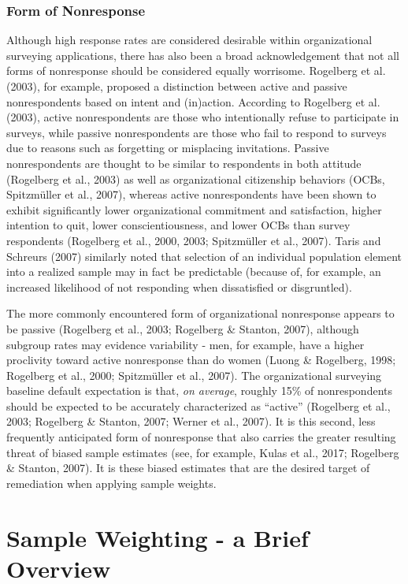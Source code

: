 \documentclass[
  man,mask]{apa7}
\begin{document}
\subsubsection{Form of Nonresponse}\label{form-of-nonresponse}

Although high response rates are considered desirable within organizational surveying applications, there has also been a broad acknowledgement that not all forms of nonresponse should be considered equally worrisome. Rogelberg et al. (2003), for example, proposed a distinction between active and passive nonrespondents based on intent and (in)action. According to Rogelberg et al. (2003), active nonrespondents are those who intentionally refuse to participate in surveys, while passive nonrespondents are those who fail to respond to surveys due to reasons such as forgetting or misplacing invitations. Passive nonrespondents are thought to be similar to respondents in both attitude (Rogelberg et al., 2003) as well as organizational citizenship behaviors (OCBs, Spitzmüller et al., 2007), whereas active nonrespondents have been shown to exhibit significantly lower organizational commitment and satisfaction, higher intention to quit, lower conscientiousness, and lower OCBs than survey respondents (Rogelberg et al., 2000, 2003; Spitzmüller et al., 2007). Taris and Schreurs (2007) similarly noted that selection of an individual population element into a realized sample may in fact be predictable (because of, for example, an increased likelihood of not responding when dissatisfied or disgruntled).

The more commonly encountered form of organizational nonresponse appears to be passive (Rogelberg et al., 2003; Rogelberg \& Stanton, 2007), although subgroup rates may evidence variability - men, for example, have a higher proclivity toward active nonresponse than do women (Luong \& Rogelberg, 1998; Rogelberg et al., 2000; Spitzmüller et al., 2007). The organizational surveying baseline default expectation is that, \emph{on average}, roughly 15\% of nonrespondents should be expected to be accurately characterized as ``active'' (Rogelberg et al., 2003; Rogelberg \& Stanton, 2007; Werner et al., 2007). It is this second, less frequently anticipated form of nonresponse that also carries the greater resulting threat of biased sample estimates (see, for example, Kulas et al., 2017; Rogelberg \& Stanton, 2007). It is these biased estimates that are the desired target of remediation when applying sample weights.

\section{Sample Weighting - a Brief Overview}\label{sample-weighting---a-brief-overview}
\end{document}
